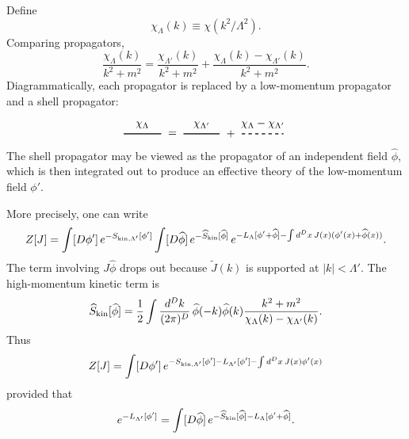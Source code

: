 Define
\[
  \chi_\Lambda(k)\equiv \chi(k^2/\Lambda^2).
\]
Comparing propagators,
\[
  \frac{\chi_\Lambda(k)}{k^2+m^2}
  =
  \frac{\chi_{\Lambda'}(k)}{k^2+m^2}
  +
  \frac{\chi_\Lambda(k)-\chi_{\Lambda'}(k)}{k^2+m^2}.
\]
Diagrammatically, each propagator is replaced by a low-momentum propagator
and a shell propagator:
\[
\begin{tikzpicture}[>=Stealth,scale=0.88,baseline=(current bounding box.center)]
  \draw[line width=.9pt] (-4.1,0)--(-2.75,0);
  \node at (-3.43,.32) {\(\chi_\Lambda\)};
  \node at (-2.35,0) {\(=\)};
  \draw[line width=.9pt] (-1.95,0)--(-.65,0);
  \node at (-1.3,.32) {\(\chi_{\Lambda'}\)};
  \node at (-.25,0) {\(+\)};
  \draw[line width=.9pt,dashed] (.15,0)--(1.65,0);
  \node at (.9,.35) {\(\chi_\Lambda-\chi_{\Lambda'}\)};
\end{tikzpicture}
\]
The shell propagator may be viewed as the propagator of an independent field
\(\widehat\phi\), which is then integrated out to produce an effective
theory of the low-momentum field \(\phi'\).

More precisely, one can write
\[
\begin{aligned}
  Z[J]
  =
  \int [D\phi']\,e^{-S_{{\rm kin},\Lambda'}[\phi']}
  \int [D\widehat\phi]\,
  e^{-\widehat S_{\rm kin}[\widehat\phi]}\,
  e^{-L_\Lambda[\phi'+\widehat\phi]
    -\int d^Dx\,J(x)(\phi'(x)+\widehat\phi(x))}.
\end{aligned}
\]
The term involving \(J\widehat\phi\) drops out because
\(\widetilde J(k)\) is supported at \(|k|<\Lambda'\).  The high-momentum
kinetic term is
\[
  \widehat S_{\rm kin}[\widehat\phi]
  =
  \frac12\int\frac{d^Dk}{(2\pi)^D}\,
  \widehat\phi(-k)\widehat\phi(k)
  \frac{k^2+m^2}{\chi_\Lambda(k)-\chi_{\Lambda'}(k)}.
\]
Thus
\[
  Z[J]
  =
  \int [D\phi']\,
  e^{-S_{{\rm kin},\Lambda'}[\phi']-L_{\Lambda'}[\phi']
    -\int d^Dx\,J(x)\phi'(x)}
\]
provided that
\[
  e^{-L_{\Lambda'}[\phi']}
  =
  \int [D\widehat\phi]\,
  e^{-\widehat S_{\rm kin}[\widehat\phi]
    -L_\Lambda[\phi'+\widehat\phi]}.
\]

